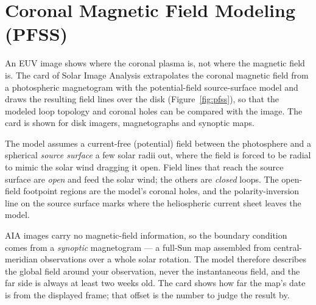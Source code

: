 \chapter{Coronal Magnetic Field Modeling (PFSS)}
\label{ch:pfss}

An EUV image shows where the coronal plasma is, not where the magnetic field is. The
 card of Solar Image Analysis extrapolates the coronal magnetic
field from a photospheric magnetogram with the potential-field source-surface model
\parencite{schatten1969,altschuler1969} and draws the resulting field lines over the disk
(Figure~\ref{fig:pfss}), so that the modeled loop topology and coronal holes can be compared
with the image. The card is shown for disk imagers, magnetographs and synoptic maps.


\begin{background}
  The model assumes a current-free (potential) field between the photosphere and a spherical
  \emph{source surface} a few solar radii out, where the field is forced to be radial to
  mimic the solar wind dragging it open. Field lines that reach the source surface are
  \emph{open} and feed the solar wind; the others are \emph{closed} loops. The open-field
  footpoint regions are the model's coronal holes, and the polarity-inversion line on the
  source surface marks where the heliospheric current sheet leaves the model.
\end{background}

\begin{caution}
  AIA images carry no magnetic-field information, so the boundary condition comes from a
  \emph{synoptic} magnetogram --- a full-Sun map assembled from central-meridian observations
  over a whole solar rotation. The model therefore describes the global field around your
  observation, never the instantaneous field, and the far side is always at least two weeks
  old. The card shows how far the map's date is from the displayed frame; that offset is the
  number to judge the result by.
\end{caution}

